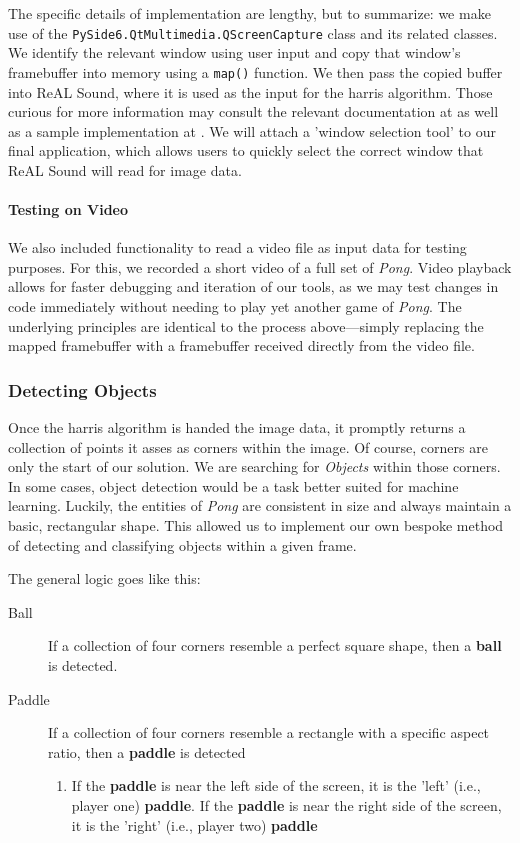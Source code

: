 \documentclass{report}
\newcommand{\rs}{ReAL Sound\xspace}
\newcommand{\pad}{\textbf{paddle}\xspace}
\newcommand{\ball}{\textbf{ball}\xspace}
\begin{document}
The specific details of implementation are lengthy, but to summarize: we make use of the \texttt{PySide6.QtMultimedia.QScreenCapture} class and its related classes. We identify the relevant window using user input and copy that window's framebuffer into memory using a \texttt{map()} function. We then pass the copied buffer into \rs, where it is used as the input for the harris algorithm.  Those curious for more information may consult the relevant documentation at \cite{QT_Doc} as well as a sample implementation at \cite{QT_EX}. We will attach a 'window selection tool' to our final application, which allows users to quickly select the correct window that \rs will read for image data. 

\paragraph{Testing on Video} 
We also included functionality to read a video file as input data for testing purposes. For this, we recorded a short video of a full set of \emph{Pong}. Video playback allows for faster debugging and iteration of our tools, as we may test changes in code immediately without needing to play yet another game of \emph{Pong}. The underlying principles are identical to the process above---simply replacing the mapped framebuffer with a framebuffer received directly from the video file.

\subsubsection{Detecting Objects}
Once the harris algorithm is handed the image data, it promptly returns a collection of points it asses as corners within the image. Of course, corners are only the start of our solution. We are searching for \emph{Objects} within those corners. In some cases, object detection would be a task better suited for machine learning. Luckily, the entities of \emph{Pong} are consistent in size and always maintain a basic, rectangular shape. This allowed us to implement our own bespoke method of detecting and classifying objects within a given frame.

The general logic goes like this:

\begin{description}
    \item[Ball] If a collection of four corners resemble a perfect square shape, then a \ball is detected.  
    \item[Paddle] If a collection of four corners resemble a rectangle with a specific aspect ratio, then a \pad is detected
        \begin{enumerate}
            \item If the \pad is near the left side of the screen, it is the 'left' (i.e., player one) \pad. If the \pad is near the right side of the screen, it is the 'right' (i.e., player two) \pad
        \end{enumerate}
\end{description}
\end{document}
